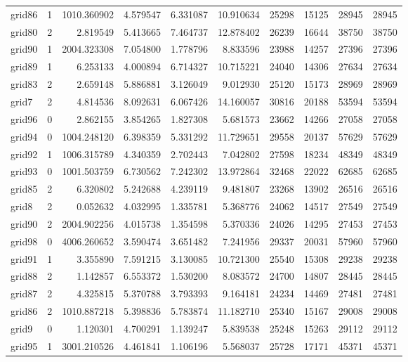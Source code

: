 \begin{longtable}{|l|r|r|r|r|r|r|r|r|r|}
grid86 & 1 & 1010.360902 & 4.579547 & 6.331087 & 10.910634 & 25298 & 15125 & 28945 & 28945 \\
grid80 & 2 & 2.819549 & 5.413665 & 7.464737 & 12.878402 & 26239 & 16644 & 38750 & 38750 \\
grid90 & 1 & 2004.323308 & 7.054800 & 1.778796 & 8.833596 & 23988 & 14257 & 27396 & 27396 \\
grid89 & 1 & 6.253133 & 4.000894 & 6.714327 & 10.715221 & 24040 & 14306 & 27634 & 27634 \\
grid83 & 2 & 2.659148 & 5.886881 & 3.126049 & 9.012930 & 25120 & 15173 & 28969 & 28969 \\
grid7 & 2 & 4.814536 & 8.092631 & 6.067426 & 14.160057 & 30816 & 20188 & 53594 & 53594 \\
grid96 & 0 & 2.862155 & 3.854265 & 1.827308 & 5.681573 & 23662 & 14266 & 27058 & 27058 \\
grid94 & 0 & 1004.248120 & 6.398359 & 5.331292 & 11.729651 & 29558 & 20137 & 57629 & 57629 \\
grid92 & 1 & 1006.315789 & 4.340359 & 2.702443 & 7.042802 & 27598 & 18234 & 48349 & 48349 \\
grid93 & 0 & 1001.503759 & 6.730562 & 7.242302 & 13.972864 & 32468 & 22022 & 62685 & 62685 \\
grid85 & 2 & 6.320802 & 5.242688 & 4.239119 & 9.481807 & 23268 & 13902 & 26516 & 26516 \\
grid8 & 2 & 0.052632 & 4.032995 & 1.335781 & 5.368776 & 24062 & 14517 & 27549 & 27549 \\
grid90 & 2 & 2004.902256 & 4.015738 & 1.354598 & 5.370336 & 24026 & 14295 & 27453 & 27453 \\
grid98 & 0 & 4006.260652 & 3.590474 & 3.651482 & 7.241956 & 29337 & 20031 & 57960 & 57960 \\
grid91 & 1 & 3.355890 & 7.591215 & 3.130085 & 10.721300 & 25540 & 15308 & 29238 & 29238 \\
grid88 & 2 & 1.142857 & 6.553372 & 1.530200 & 8.083572 & 24700 & 14807 & 28445 & 28445 \\
grid87 & 2 & 4.325815 & 5.370788 & 3.793393 & 9.164181 & 24234 & 14469 & 27481 & 27481 \\
grid86 & 2 & 1010.887218 & 5.398836 & 5.783874 & 11.182710 & 25340 & 15167 & 29008 & 29008 \\
grid9 & 0 & 1.120301 & 4.700291 & 1.139247 & 5.839538 & 25248 & 15263 & 29112 & 29112 \\
grid95 & 1 & 3001.210526 & 4.461841 & 1.106196 & 5.568037 & 25728 & 17171 & 45371 & 45371 \\

\end{longtable}
